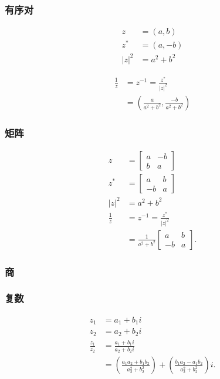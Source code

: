 \subsubsection*{有序对}
$$
\begin{aligned}
z & =(a, b) \\
z^{*} & =(a,-b) \\
|z|^{2} & =a^{2}+b^{2}
\end{aligned}
$$

$$
\begin{aligned}
\frac{1}{z} & =z^{-1}=\frac{z^{*}}{|z|^{2}} \\
& =\left(\frac{a}{a^{2}+b^{2}}, \frac{-b}{a^{2}+b^{2}}\right)
\end{aligned}
$$

\subsubsection*{矩阵}
$$
\begin{aligned}
z & =\left[\begin{array}{cc}
a & -b \\
b & a
\end{array}\right] \\
z^{*} & =\left[\begin{array}{cc}
a & b \\
-b & a
\end{array}\right] \\
|z|^{2} & =a^{2}+b^{2} \\
\frac{1}{z} & =z^{-1}=\frac{z^{*}}{|z|^{2}} \\
& =\frac{1}{a^{2}+b^{2}}\left[\begin{array}{cc}
a & b \\
-b & a
\end{array}\right] .
\end{aligned}
$$

\subsubsection{商}
\subsubsection*{复数}

$$
\begin{aligned}
z_{1} & =a_{1}+b_{1} i \\
z_{2} & =a_{2}+b_{2} i \\
\frac{z_{1}}{z_{2}} & =\frac{a_{1}+b_{1} i}{a_{2}+b_{2} i} \\
& =\left(\frac{a_{1} a_{2}+b_{1} b_{2}}{a_{2}^{2}+b_{2}^{2}}\right)+\left(\frac{b_{1} a_{2}-a_{1} b_{2}}{a_{2}^{2}+b_{2}^{2}}\right) i .
\end{aligned}
$$

